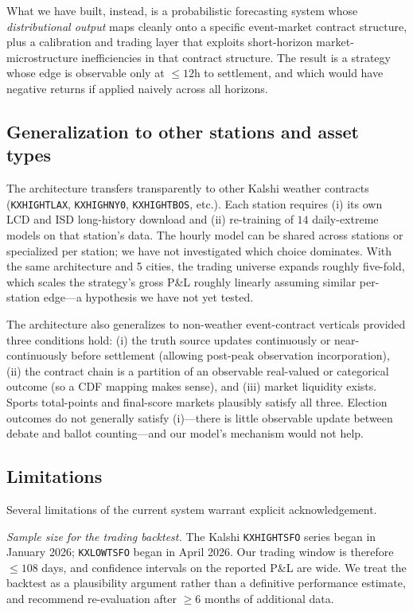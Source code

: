\documentclass[11pt]{article}
\begin{document}
What we have built, instead, is a probabilistic forecasting system whose
\emph{distributional output} maps cleanly onto a specific event-market
contract structure, plus a calibration and trading layer that exploits
short-horizon market-microstructure inefficiencies in that contract
structure. The result is a strategy whose edge is observable only at
$\le 12$h to settlement, and which would have negative returns if applied
naively across all horizons.

\subsection{Generalization to other stations and asset types}

The architecture transfers transparently to other Kalshi weather contracts
(\texttt{KXHIGHTLAX}, \texttt{KXHIGHNY0}, \texttt{KXHIGHTBOS}, etc.). Each
station requires (i) its own LCD and ISD long-history download and
(ii) re-training of $14$ daily-extreme models on that station's data. The
hourly model can be shared across stations or specialized per station;
we have not investigated which choice dominates. With the same architecture
and 5 cities, the trading universe expands roughly five-fold, which scales
the strategy's gross P\&L roughly linearly assuming similar per-station
edge---a hypothesis we have not yet tested.

The architecture also generalizes to non-weather event-contract verticals
provided three conditions hold: (i) the truth source updates continuously
or near-continuously before settlement (allowing post-peak observation
incorporation), (ii) the contract chain is a partition of an observable
real-valued or categorical outcome (so a CDF mapping makes sense), and
(iii) market liquidity exists. Sports total-points and final-score markets
plausibly satisfy all three. Election outcomes do not generally satisfy
(i)---there is little observable update between debate and ballot
counting---and our model's mechanism would not help.

\subsection{Limitations}

Several limitations of the current system warrant explicit acknowledgement.

\textit{Sample size for the trading backtest.} The Kalshi
\texttt{KXHIGHTSFO} series began in January 2026; \texttt{KXLOWTSFO} began
in April 2026. Our trading window is therefore $\le 108$ days, and confidence
intervals on the reported P\&L are wide. We treat the backtest as a
plausibility argument rather than a definitive performance estimate, and
recommend re-evaluation after $\ge 6$ months of additional data.
\end{document}
